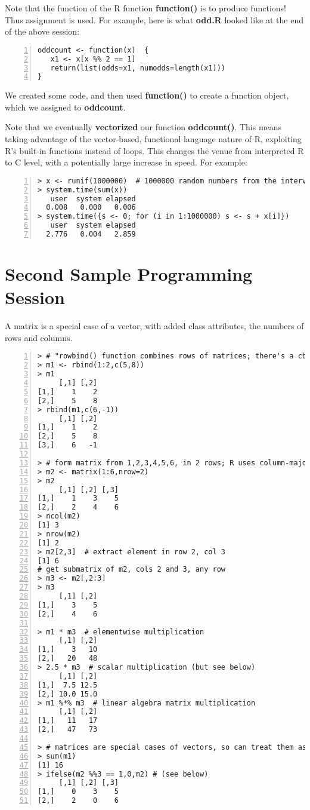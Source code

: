 Note that the function of the R function {\bf function()} is to produce
functions! Thus assignment is used. For example, here is what {\bf
odd.R} looked like at the end of the above session:

\begin{lstlisting}[numbers=left]
oddcount <- function(x)  {
   x1 <- x[x %% 2 == 1]
   return(list(odds=x1, numodds=length(x1)))
}
\end{lstlisting}
  
We created some code, and then used {\bf function()} to create a function
object, which we assigned to {\bf oddcount}.

Note that we eventually {\bf vectorized} our function {\bf oddcount()}.
This means taking advantage of the vector-based, functional language
nature of R, exploiting R's built-in functions instead of loops.  This
changes the venue from interpreted R to C level, with a potentially
large increase in speed.  For example:

\begin{lstlisting}[numbers=left]
> x <- runif(1000000)  # 1000000 random numbers from the interval (0,1)
> system.time(sum(x))
   user  system elapsed 
  0.008   0.000   0.006 
> system.time({s <- 0; for (i in 1:1000000) s <- s + x[i]})
   user  system elapsed 
  2.776   0.004   2.859 
\end{lstlisting}

\section{Second Sample Programming Session}

A matrix is a special case of a vector, with added class attributes,
the numbers of rows and columns.

\begin{lstlisting}[numbers=left]
> # "rowbind() function combines rows of matrices; there's a cbind() too
> m1 <- rbind(1:2,c(5,8))
> m1
     [,1] [,2]
[1,]    1    2
[2,]    5    8
> rbind(m1,c(6,-1))
     [,1] [,2]
[1,]    1    2
[2,]    5    8
[3,]    6   -1

> # form matrix from 1,2,3,4,5,6, in 2 rows; R uses column-major storage
> m2 <- matrix(1:6,nrow=2)  
> m2
     [,1] [,2] [,3]
[1,]    1    3    5
[2,]    2    4    6
> ncol(m2)
[1] 3
> nrow(m2)
[1] 2
> m2[2,3]  # extract element in row 2, col 3
[1] 6
# get submatrix of m2, cols 2 and 3, any row
> m3 <- m2[,2:3]
> m3
     [,1] [,2]
[1,]    3    5
[2,]    4    6

> m1 * m3  # elementwise multiplication
     [,1] [,2]
[1,]    3   10
[2,]   20   48
> 2.5 * m3  # scalar multiplication (but see below)
     [,1] [,2]
[1,]  7.5 12.5
[2,] 10.0 15.0
> m1 %*% m3  # linear algebra matrix multiplication
     [,1] [,2]
[1,]   11   17
[2,]   47   73

> # matrices are special cases of vectors, so can treat them as vectors 
> sum(m1)
[1] 16
> ifelse(m2 %%3 == 1,0,m2) # (see below)
     [,1] [,2] [,3]
[1,]    0    3    5
[2,]    2    0    6
\end{lstlisting}

